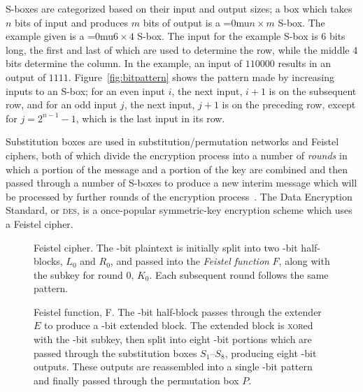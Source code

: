 \documentclass[a4paper,10pt,twoside,openright]{book}
\renewcommand{\sc}[1]{\textsc{\lowercase{#1}}}
\renewcommand{\ln}[1]{{\fontsize{8pt}{8pt}\selectfont#1}}
\newif\ifdebug
\newcommand{\FIXME}[1]{\ifdebug\marginpar{{\small\color{red}\textbf{FIXME: #1}}}\fi}
\newcommand*\sixbyfour{\begingroup\medmuskip=0mu\relax$6 \times 4$\endgroup}
\newcommand*\nbym{\begingroup\medmuskip=0mu\relax$n \times m$\endgroup}
\begin{document}
S-boxes are categorized based on their input and output sizes; a box which takes $n$ bits of input and produces $m$ bits of output is a \nbym{} S-box. The example given is a \sixbyfour{} S-box. The input for the example S-box is 6 bits long, the first and last of which are used to determine the row, while the middle 4 bits determine the column. In the example, an input of $110000$ results in an output of $1111$.
Figure~\ref{fig:bitpattern} shows the pattern made by increasing inputs to an S-box; 
for an even input $i$, the next input, $i + 1$ is on the subsequent row, 
and for an odd input $j$, the next input, $j+1$ is on the preceding row,
except for $j = 2^{n-1}-1$, which is the last input in its row.
\FIXME{ugh, this wording is awful}

Substitution boxes are used in substitution\-/permutation networks and Feistel ciphers, both of which divide the encryption process into a number of \textit{rounds} in which a portion of the message and a portion of the key are combined and then passed through a number of S-boxes to produce a new interim message which will be processed by further rounds of the encryption process~\cite{crypto}. The Data Encryption Standard, or \sc{DES}, is a once-popular symmetric-key encryption scheme which uses a Feistel cipher.
\begin{figure}
    \centering
    
    \caption[Feistel cipher]{Feistel cipher. The \ln{64}-bit plaintext is initially split into two \ln{32}-bit half-blocks, $L_0$ and $R_0$, and passed into the \textit{Feistel function} $F$, along with the subkey for round $0$, $K_0$. Each subsequent round follows the same pattern.}
    \label{fig:feistel}
\end{figure}

\begin{figure}
    \centering
    
    \caption[Feistel function]{Feistel function, F. The \ln{32}-bit half-block passes through the extender $E$ to produce a \ln{48}-bit extended block. The extended block is \sc{XOR}ed with the \ln{48}-bit subkey, then split into eight \ln{6}-bit portions which are passed through the substitution boxes $S_1$--$S_8$, producing eight \ln{4}-bit outputs. These outputs are reassembled into a single \ln{32}-bit pattern and finally passed through the permutation box $P$.}
    \label{fig:desround}
\end{figure}
\end{document}
